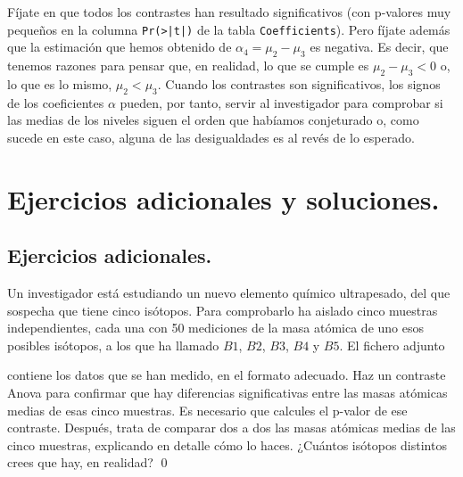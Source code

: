 \documentclass[10pt,a4paper]{article}\usepackage[]{graphicx}\usepackage[]{color}
\newcounter {cont01}
\begin{document}
Fíjate en que todos los contrastes han resultado significativos (con p-valores muy pequeños en la columna {\tt Pr(>|t|)} de la tabla {\tt Coefficients}). Pero fíjate además que la estimación que hemos obtenido de $\alpha_4 = \mu_2 - \mu_3$ es negativa. Es decir, que tenemos razones para pensar que, en realidad, lo que se cumple es $\mu_2 - \mu_3 < 0$ o, lo que es lo mismo, $\mu_2 < \mu_3$. Cuando los contrastes son significativos, los signos de los coeficientes $\alpha$ pueden, por tanto, servir al investigador para comprobar si las medias de los niveles siguen el orden que habíamos conjeturado o, como sucede en este caso, alguna de las desigualdades
es al revés de lo esperado.

\section{Ejercicios adicionales y soluciones.}
\label{tut11:sec:EjerciciosAdicionalesYSoluciones}

\subsection*{Ejercicios adicionales.}
\label{tut11:subsec:EjerciciosAdicionales}

\begin{ejercicio}
\label{tut11:ejercicio11}

Un investigador está estudiando un nuevo elemento químico ultrapesado, del que sospecha que tiene cinco isótopos. Para comprobarlo ha aislado cinco muestras independientes, cada una con 50 mediciones de la masa atómica de uno esos posibles isótopos, a los que ha llamado $B1$, $B2$, $B3$, $B4$ y $B5$. El fichero adjunto
\begin{center}
\end{center}
contiene los datos que se han medido, en el formato adecuado. Haz un contraste Anova para confirmar que hay diferencias significativas entre las masas atómicas medias de esas cinco muestras. Es necesario que calcules el p-valor de ese contraste. Después, trata de comparar dos a dos las masas atómicas medias de las cinco muestras, explicando en detalle cómo lo haces. ¿Cuántos isótopos distintos crees que hay, en realidad?
\qed
\end{ejercicio}


\end{document}
